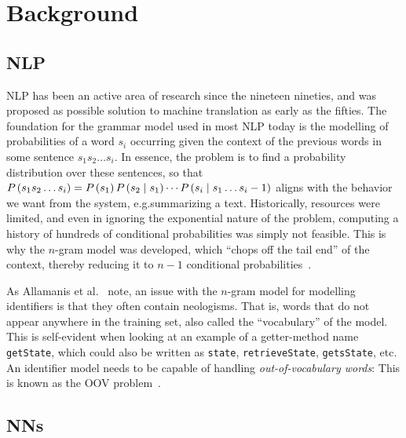 \documentclass[conference]{IEEEtran}
\def\P(#1){\ensuremath{P\mkern-0.5mu\left( #1 \right)}}
\begin{document}

\section{Background}
\label{sec:Background}

\subsection{\acl{NLP}}
\label{ssec:Natural-Language-Processing}

\ac{NLP} has been an active area of research since the nineteen nineties, and was proposed
as possible solution to machine translation as early as the fifties. The foundation for
the grammar model used in most \ac{NLP} today is the modelling of probabilities of a word
$s_i$ occurring given the context of the previous words in some sentence $s_1 s_2 \ldots
s_i$. In essence, the problem is to find a probability distribution over these sentences,
so that $\P(s_1 s_2 \ldots s_i) = \P(s_1) \P(s_2 \mid s_1) \cdots \P(s_i \mid s_1 \ldots
s_{i-1})$ aligns with the behavior we want from the system, e.g.\@ summarizing a text.
Historically, resources were limited, and even in ignoring the exponential nature of the
problem, computing a history of hundreds of conditional probabilities was simply not
feasible. This is why the $n$-gram model was developed, which ``chops off the tail end''
of the context, thereby reducing it to $n - 1$ conditional
probabilities~\cite{Brown1990StatMT}.

As Allamanis et al.\@~\cite{Allamanis2015Suggesting} note, an issue with the $n$-gram
model for modelling identifiers is that they often contain neologisms. That is, words that
do not appear anywhere in the training set, also called the ``vocabulary'' of the model.
This is self-evident when looking at an example of a getter-method name \verb-getState-,
which could also be written as \verb-state-, \verb-retrieveState-,  \verb-getsState-, etc.
An identifier model needs to be capable of handling \emph{out-of-vocabulary words}: This
is known as the \ac{OOV} problem~\cite{Shi2022Splitting}.


\subsection{\aclp{NN}}
\label{ssec:Neural-Networks}
\end{document}
